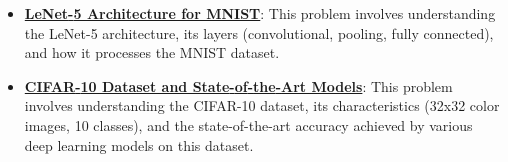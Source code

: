 \documentclass{article}%
\begin{document}
\begin{itemize}[leftmargin=*]
\item \href{https://purdue.brightspace.com/d2l/common/assets/pdfjs-d2l-dist/1.0.14-legacy/web/viewer.html?file=\%2Fcontent\%2Fenforced\%2F1095467-wl.202510.CS.24300.001\%2F09L1-cnn.pdf\%3Fou\%3D1095467\&lang=en-us\&container=d2l-fileviewer-rendered-pdf\&fullscreen=d2l-fileviewer-rendered-pdf-dialog\&height=667#page=22}{\textbf{LeNet{-}5 Architecture for MNIST}}: This problem involves understanding the LeNet-5 architecture, its layers (convolutional, pooling, fully connected), and how it processes the MNIST dataset.%
\item \href{https://purdue.brightspace.com/d2l/common/assets/pdfjs-d2l-dist/1.0.14-legacy/web/viewer.html?file=\%2Fcontent\%2Fenforced\%2F1095467-wl.202510.CS.24300.001\%2F09L1-cnn.pdf\%3Fou\%3D1095467\&lang=en-us\&container=d2l-fileviewer-rendered-pdf\&fullscreen=d2l-fileviewer-rendered-pdf-dialog\&height=667#page=23}{\textbf{CIFAR{-}10 Dataset and State{-}of{-}the{-}Art Models}}: This problem involves understanding the CIFAR-10 dataset, its characteristics (32x32 color images, 10 classes), and the state-of-the-art accuracy achieved by various deep learning models on this dataset.%
\end{itemize}%
\end{document}
